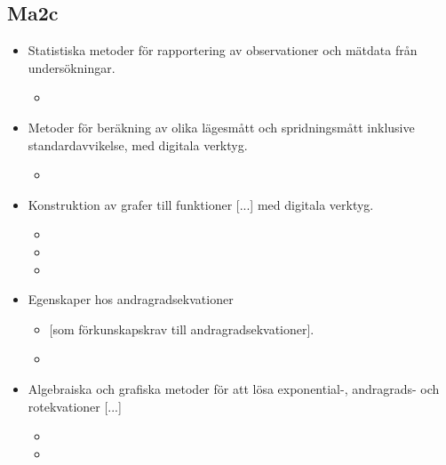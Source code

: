 \subsection*{Ma2c}
\begin{itemize}
\item Statistiska metoder för rapportering av observationer och mätdata från undersökningar.
	\begin{itemize}
	\item {}
	\end{itemize}
\item Metoder för beräkning av olika lägesmått och spridningsmått inklusive standardavvikelse, med digitala verktyg.
	\begin{itemize}
	\item {}
	\end{itemize}
\item Konstruktion av grafer till funktioner [...] med digitala verktyg.
	\begin{itemize}
	\item {}
	\item {}
	\item {}
	\end{itemize}
\item Egenskaper hos andragradsekvationer
	\begin{itemize}
	\item {} {\color{myBlue}[som förkunskapskrav till andragradsekvationer].}
	\item {}
	\end{itemize}
\item Algebraiska och grafiska metoder för att lösa exponential-, andragrads- och rotekvationer [...]
	\begin{itemize}
	\item {}
	\item {}
	\end{itemize}
\end{itemize}

